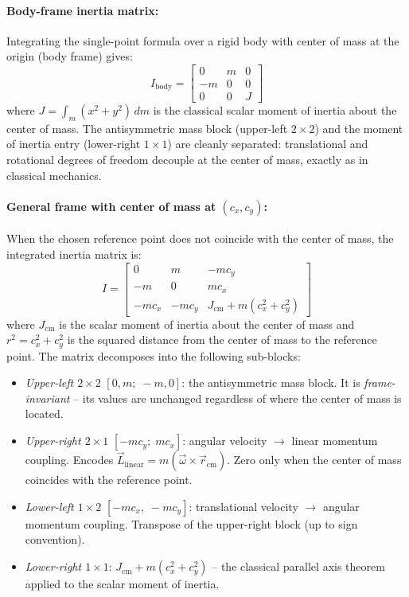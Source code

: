 \paragraph{Body-frame inertia matrix:} Integrating the single-point formula over a rigid
body
with center of mass at the origin (body frame) gives:
\begin{equation}
    I_\mathrm{body} =
    \begin{bmatrix}
        0  &  m  &  0 \\
        -m &  0  &  0 \\
        0  &  0  &  J
    \end{bmatrix}
    \label{eq:inertia_2D_body}
\end{equation}
where $J = \int_m (x^2 + y^2)\,dm$ is the classical scalar moment of inertia about the
center of mass. The antisymmetric mass block (upper-left $2\times2$) and the moment of
inertia entry (lower-right $1\times1$) are cleanly separated: translational and rotational
degrees of freedom decouple at the center of mass, exactly as in classical mechanics.

\paragraph{General frame with center of mass at $(c_x, c_y)$:} When the chosen reference
point
does not coincide with the center of mass, the integrated inertia matrix is:
\begin{equation}
    I =
    \begin{bmatrix}
        0      &  m     & -m c_y                              \\
        -m     &  0     &  m c_x                              \\
        -m c_x & -m c_y & J_\mathrm{cm} + m(c_x^2 + c_y^2)
    \end{bmatrix}
    \label{eq:inertia_2D_general}
\end{equation}
where $J_\mathrm{cm}$ is the scalar moment of inertia about the center of mass and $r^2 =
c_x^2 + c_y^2$ is the squared distance from the center of mass to the reference point. The
matrix decomposes into the following sub-blocks:
\begin{itemize}
    \item \emph{Upper-left $2\times2$} $[0, m;\; -m, 0]$: the antisymmetric mass block.
    It is \emph{frame-invariant} -- its values are unchanged regardless of where the
    center of mass is located.
    \item \emph{Upper-right $2\times1$} $[-mc_y;\; mc_x]$: angular velocity $\to$ linear
    momentum coupling. Encodes $\vec{L}_\mathrm{linear} = m(\vec{\omega} \times
    \vec{r}_\mathrm{cm})$. Zero only when the center of mass coincides with the reference
    point.
    \item \emph{Lower-left $1\times2$} $[-mc_x,\; -mc_y]$: translational velocity $\to$
    angular momentum coupling. Transpose of the upper-right block (up to sign convention).
    \item \emph{Lower-right $1\times1$}: $J_\mathrm{cm} + m(c_x^2 + c_y^2)$ -- the
    classical parallel axis theorem applied to the scalar moment of inertia.
\end{itemize}

